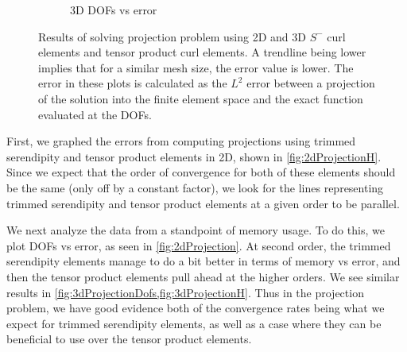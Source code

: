 \documentclass[format=acmsmall,screen,timestamp=false,a4paper]{acmart}
\newcommand\josh[1]{\textbf{\textcolor[rgb]{0,.5,1}{[Josh: #1]}}}
\begin{document}
\begin{figure}[htbp]
\begin{subfigure}[h]{0.48\textwidth}
    \caption{3D DOFs vs error\label{fig:3dProjectionDofs}}
  \end{subfigure}
  \caption{Results of solving projection problem using 2D and 3D $S^-$ curl elements and tensor product curl elements.  A trendline being lower implies that for a similar mesh size, the error value is lower.  The error in these plots is calculated as the $L^2$ error between a projection of the solution into the finite element space and the exact function evaluated at the DOFs.} 
\end{figure}

First, we graphed the errors from computing projections using trimmed serendipity and tensor product elements in 2D, shown in \cref{fig:2dProjectionH}.  Since we expect that the order of convergence for both of these elements should be the same (only off by a constant factor), we look for the lines representing trimmed serendipity and tensor product elements at a given order to be parallel.
  
We next analyze the data from a standpoint of memory usage.  To do this, we plot DOFs vs error, as seen in \cref{fig:2dProjection}. At second order, the trimmed serendipity elements manage to do a bit better in terms of memory vs error, and then the tensor product elements pull ahead at the higher orders. We see similar results in \cref{fig:3dProjectionDofs,fig:3dProjectionH}.  Thus in the projection problem, we have good evidence both of the convergence rates being what we expect for trimmed serendipity elements, as well as a case where they can be beneficial to use over the tensor product elements.


 
\end{document}
